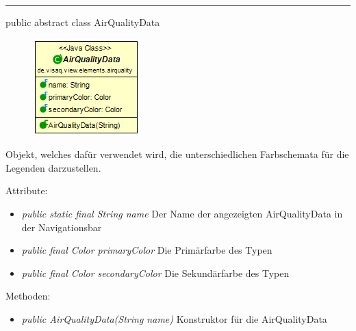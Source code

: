 \clearpage %
\rule{\textwidth}{0.4pt}
public abstract class AirQualityData

\begin{minipage}{0.3\textwidth}
    \begin{figure}[H]
        \includegraphics[scale = 0.6]{media/frontend/view/de.view.elements.airquality/AirQualityData_Class.png}
    \end{figure}
    \end{minipage} \hfill
    \begin{minipage}{0.6\textwidth}
Objekt, welches dafür verwendet wird, die unterschiedlichen Farbschemata für die Legenden darzustellen.
\end{minipage}

Attribute:
\begin{itemize}
    \item \emph{public static final String name} Der Name der angezeigten AirQualityData in der Navigationsbar
    \item \emph{public final Color primaryColor} Die Primärfarbe des Typen
	\item \emph{public final Color secondaryColor} Die Sekundärfarbe des Typen
\end{itemize}
Methoden:
\begin{itemize}
    \item \emph{public AirQualityData(String name)} Konstruktor für die AirQualityData
\end{itemize}
